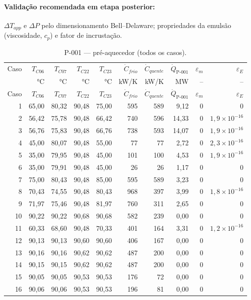 \documentclass[11pt,a4paper]{article}
\numberwithin{equation}{section}
\numberwithin{table}{section}
\numberwithin{figure}{section}
\begin{document}
\paragraph{Validação recomendada em etapa posterior:} $\Delta T_{app}$ e $\Delta P$ pelo dimensionamento Bell--Delaware; propriedades da emulsão (viscosidade, $c_p$) e fator de incrustação.
{\footnotesize\setlength{\tabcolsep}{3.5pt}\begin{longtable}{rrrrrrrrrr}
\caption{P-001 --- pré-aquecedor (todos os casos).\label{tab:b03}}\\\toprule
Caso & $T_{C06}$ & $T_{C07}$ & $T_{C22}$ & $T_{C23}$ & $\dot C_{frio}$ & $\dot C_{quente}$ & $\dot Q_{\mbox{P-001}}$ & $\varepsilon_m$ & $\varepsilon_E$\\
 & °C & °C & °C & °C & kW/K & kW/K & MW & -- & --\\\midrule\endfirsthead
\toprule Caso & $T_{C06}$ & $T_{C07}$ & $T_{C22}$ & $T_{C23}$ & $\dot C_{frio}$ & $\dot C_{quente}$ & $\dot Q_{\mbox{P-001}}$ & $\varepsilon_m$ & $\varepsilon_E$\\\midrule\endhead
1 & 65,00 & 80,32 & 90,48 & 75,00 & 595 & 589 & 9,12 & $0$ & $0$\\
2 & 56,42 & 75,78 & 90,48 & 66,42 & 740 & 596 & 14,33 & $0$ & $1{,}9\times10^{-16}$\\
3 & 56,76 & 75,83 & 90,48 & 66,76 & 738 & 593 & 14,07 & $0$ & $1{,}9\times10^{-16}$\\
4 & 45,00 & 80,07 & 90,48 & 55,00 & 77 & 77 & 2,72 & $0$ & $2{,}3\times10^{-16}$\\
5 & 35,00 & 79,95 & 90,48 & 45,00 & 101 & 100 & 4,53 & $0$ & $1{,}9\times10^{-16}$\\
6 & 35,00 & 79,91 & 90,48 & 45,00 & 26 & 26 & 1,17 & $0$ & $0$\\
7 & 75,00 & 80,43 & 90,48 & 85,00 & 595 & 589 & 3,23 & $0$ & $0$\\
8 & 70,43 & 74,55 & 90,48 & 80,43 & 968 & 397 & 3,99 & $0$ & $1{,}8\times10^{-16}$\\
9 & 71,97 & 75,46 & 90,48 & 81,97 & 760 & 311 & 2,65 & $0$ & $0$\\
10 & 90,22 & 90,22 & 90,68 & 90,68 & 582 & 239 & 0,00 & $0$ & $0$\\
11 & 60,33 & 68,60 & 90,48 & 70,33 & 401 & 164 & 3,31 & $0$ & $1{,}2\times10^{-16}$\\
12 & 90,13 & 90,13 & 90,60 & 90,60 & 406 & 167 & 0,00 & $0$ & $0$\\
13 & 90,16 & 90,16 & 90,62 & 90,62 & 487 & 200 & 0,00 & $0$ & $0$\\
14 & 90,15 & 90,15 & 90,62 & 90,62 & 487 & 200 & 0,00 & $0$ & $0$\\
15 & 90,05 & 90,05 & 90,53 & 90,53 & 176 & 72 & 0,00 & $0$ & $0$\\
16 & 90,06 & 90,06 & 90,53 & 90,53 & 196 & 81 & 0,00 & $0$ & $0$\\
\bottomrule\end{longtable}}
\end{document}
